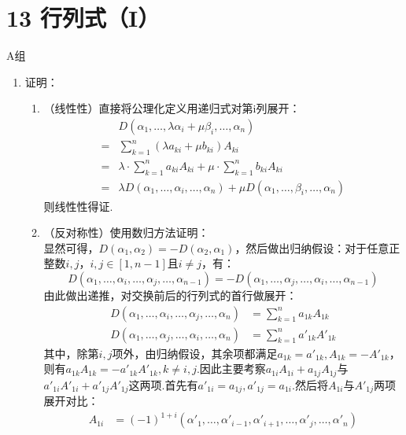 \section*{13 行列式（I）}

\vspace{2ex}

\centerline{\heiti A组}
\begin{enumerate}
    \item 证明：\begin{enumerate}
        \item （线性性）直接将公理化定义用递归式对第i列展开：
        \begin{align*}
            & D(\alpha_1,\ldots,\lambda\alpha_{i}+\mu\beta_i,\ldots,\alpha_n)\\
            ={}& \sum_{k=1}^{n}(\lambda a_{ki}+\mu b_{ki})A_{ki}\\
            ={}& \lambda \cdot \sum_{k=1}^{n}a_{ki}A_{ki}+\mu \cdot \sum_{k=1}^{n}b_{ki}A_{ki}\\
            ={}& \lambda D(\alpha_1,\ldots,\alpha_{i},\ldots,\alpha_n)+\mu D(\alpha_1,\ldots,\beta_i,\ldots,\alpha_n)
        \end{align*}
        则线性性得证.
        \item （反对称性）使用数归方法证明：\\显然可得，$D(\alpha_1,\alpha_2)=-D(\alpha_2,\alpha_1)$，然后做出归纳假设：对于任意正整数$i,j$，$i,j \in [1,n-1]$且$i \neq j$，有：
        \[ D(\alpha_1,\ldots,\alpha_i,\ldots,\alpha_j,\ldots,\alpha_{n-1})=-D(\alpha_1,\ldots,\alpha_j,\ldots,\alpha_i,\ldots,\alpha_{n-1}) \]
        由此做出递推，对交换前后的行列式的首行做展开：
        \begin{align*}
            D(\alpha_1,\ldots,\alpha_{i},\ldots,\alpha_{j},\ldots,\alpha_n)
            & =\sum_{k=1}^{n}a_{1k}A_{1k}\\
            D(\alpha_1,\ldots,\alpha_{j},\ldots,\alpha_{i},\ldots,\alpha_n)
            & =\sum_{k=1}^{n}a'_{1k}A'_{1k}
        \end{align*}
        其中，除第$i,j$项外，由归纳假设，其余项都满足$a_{1k}=a'_{1k},A_{1k}=-A'_{1k}$，则有$a_{1k}A_{1k}=-a'_{1k}A'_{1k},k\neq i,j$.因此主要考察$a_{1i}A_{1i}+a_{1j}A_{1j}$与$a'_{1i}A'_{1i}+a'_{1j}A'_{1j}$这两项.首先有$a'_{1i}=a_{1j},a'_{1j}=a_{1i}$.然后将$A_{1i}$与$A'_{1j}$两项展开对比：
        \begin{align*}
            A_{1i}&=(-1)^{1+i}(\alpha'_{1},\ldots,\alpha'_{i-1},\alpha'_{i+1},\ldots,\alpha'_{j},\ldots,\alpha'_{n})\\

\end{align*}
\end{enumerate}
\end{enumerate}
